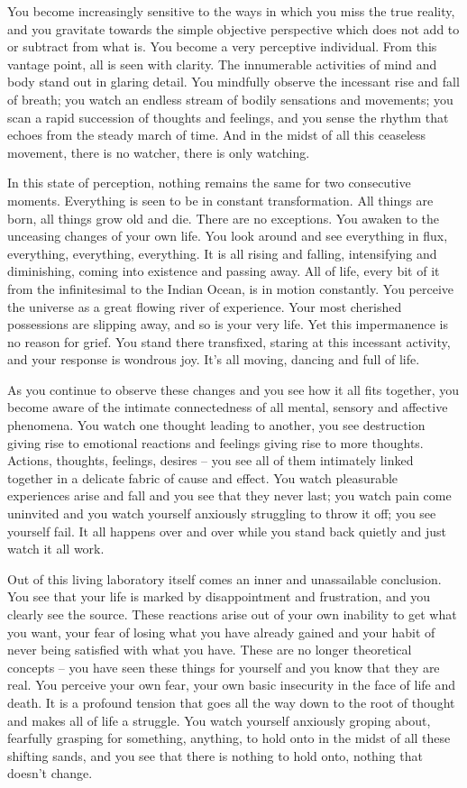 You become increasingly sensitive to the ways in which you miss the true
reality, and you gravitate towards the simple objective perspective which does
not add to or subtract from what is. You become a very perceptive individual.
From this vantage point, all is seen with clarity. The innumerable activities of
mind and body stand out in glaring detail. You mindfully observe the incessant
rise and fall of breath; you watch an endless stream of bodily sensations and
movements; you scan a rapid succession of thoughts and feelings, and you sense
the rhythm that echoes from the steady march of time. And in the midst of all
this ceaseless movement, there is no watcher, there is only watching.

In this state of perception, nothing remains the same for two consecutive
moments. Everything is seen to be in constant transformation. All things are
born, all things grow old and die. There are no exceptions. You awaken to the
unceasing changes of your own life. You look around and see everything in flux,
everything, everything, everything. It is all rising and falling, intensifying
and diminishing, coming into existence and passing away. All of life, every bit
of it from the infinitesimal to the Indian Ocean, is in motion constantly. You
perceive the universe as a great flowing river of experience. Your most
cherished possessions are slipping away, and so is your very life. Yet this
impermanence is no reason for grief. You stand there transfixed, staring at this
incessant activity, and your response is wondrous joy. It's all moving, dancing
and full of life.

As you continue to observe these changes and you see how it all fits together,
you become aware of the intimate connectedness of all mental, sensory and
affective phenomena. You watch one thought leading to another, you see
destruction giving rise to emotional reactions and feelings giving rise to more
thoughts. Actions, thoughts, feelings, desires -- you see all of them intimately
linked together in a delicate fabric of cause and effect. You watch pleasurable
experiences arise and fall and you see that they never last; you watch pain come
uninvited and you watch yourself anxiously struggling to throw it off; you see
yourself fail. It all happens over and over while you stand back quietly and
just watch it all work.

Out of this living laboratory itself comes an inner and unassailable conclusion.
You see that your life is marked by disappointment and frustration, and you
clearly see the source. These reactions arise out of your own inability to get
what you want, your fear of losing what you have already gained and your habit
of never being satisfied with what you have. These are no longer theoretical
concepts -- you have seen these things for yourself and you know that they are
real. You perceive your own fear, your own basic insecurity in the face of life
and death. It is a profound tension that goes all the way down to the root of
thought and makes all of life a struggle. You watch yourself anxiously groping
about, fearfully grasping for something, anything, to hold onto in the midst of
all these shifting sands, and you see that there is nothing to hold onto,
nothing that doesn't change.

